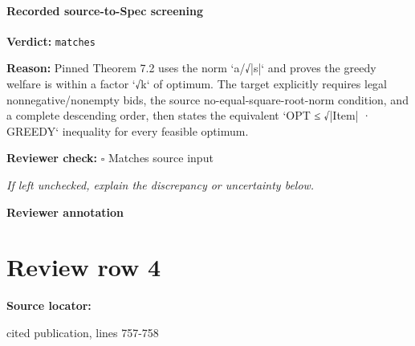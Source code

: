 \documentclass[10pt]{article}
\newcommand{\reviewerbox}{%
  \par\noindent\fbox{\parbox{0.96\linewidth}{\rule{0pt}{0.38in}}}\par
}
\newcommand{\reviewmatch}[1]{%
  \par\noindent\textbf{Reviewer check:} $\square$\; #1\par
  \noindent\emph{If left unchecked, explain the discrepancy or uncertainty below.}\par
}
\begin{document}
\paragraph{Recorded source-to-Spec screening}
\textbf{Verdict:} \texttt{matches}
\\
{\raggedright
\textbf{Reason:} Pinned Theorem 7.\allowbreak{}2 uses the norm `a/\allowbreak{}√|s|` and proves the greedy welfare is within a factor `√k` of optimum.\allowbreak{} The target explicitly requires legal nonnegative/\allowbreak{}nonempty bids, the source no-\allowbreak{}equal-\allowbreak{}square-\allowbreak{}root-\allowbreak{}norm condition, and a complete descending order, then states the equivalent `OPT ≤ √|Item| · GREEDY` inequality for every feasible optimum.\allowbreak{}
\par}
\reviewmatch{Matches source input}
\noindent\textbf{Reviewer annotation}\par
\reviewerbox
\clearpage
\hypertarget{source-claim-b5b97d0155f8ab09}{}
\section*{Review row 4}
\textbf{Source locator:} {\footnotesize\raggedright cited publication, lines 757-\allowbreak{}758\par}
\end{document}
